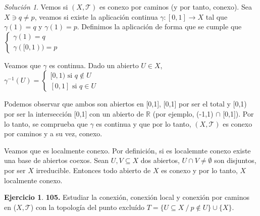 \documentclass[12pt,twoside]{report}
\newcommand\mc[1]{\mathcal{#1}}
\theoremstyle{azul}
\theoremstyle{azul2}
\theoremstyle{plain}
\theoremstyle{definition}
\newtheorem*{ejern}{Ejercicio}
\theoremstyle{remark}
\newtheorem*{sol}{Solución}
\begin{document}
\begin{sol}
Vemos si $(X, \mc{T})$ es conexo por caminos (y por tanto, conexo). Sea $X \ni q \neq p$, veamos si existe la aplicación continua $\gamma: [0,1] \longrightarrow X$ tal que $\gamma(1)=q$ y $\gamma(1)=p$. Definimos la aplicación de forma que  se cumple que $\left\{ \begin{array}{l}
     \gamma(1)=q  \\
     \gamma([0,1))=p 
\end{array} \right.$

Veamos que $\gamma$ es continua. Dado un abierto $U \in X$, $\gamma^{-1}(U)=\left\{ \begin{array}{l}
     [ 0 , 1 )  \text{ si } q \nin U  \\
     \left[ 0 , 1 \right] \text{ si } q \in U
\end{array} \right.$ 

Podemos observar que ambos son abiertos en [0,1], [0,1] por ser el total y [0,1) por ser la intersección [0,1] con un abierto de $\mathbb{R}$ (por ejemplo, (-1,1) $\cap$ [0,1]). Por lo tanto, se comprueba que $\gamma$ es continua y que por lo tanto, $(X,\mc{T})$ es conexo por caminos y a su vez, conexo. 

Veamos que es localmente conexo. Por definición, si es localemnte conexo existe una base de abiertos coexos. Sean $U, V \subseteq X$ dos abiertos, $U \cap V \neq \emptyset$ son disjuntos, por ser $X$ irreducible. Entonces todo abierto de $X$ es conexo y por lo tanto, $X$ localmente conexo.
\end{sol}
\; \vspace{-5mm}
\begin{ejern} \textbf{105.} Estudiar la conexión, conexión local y conexión por caminos en ($X,\mc{T}$) con la topología del punto excluído $T = \{U \subseteq X \: / \: p \nin  U\} \cup \{X\}$.
\end{ejern}
\end{document}
